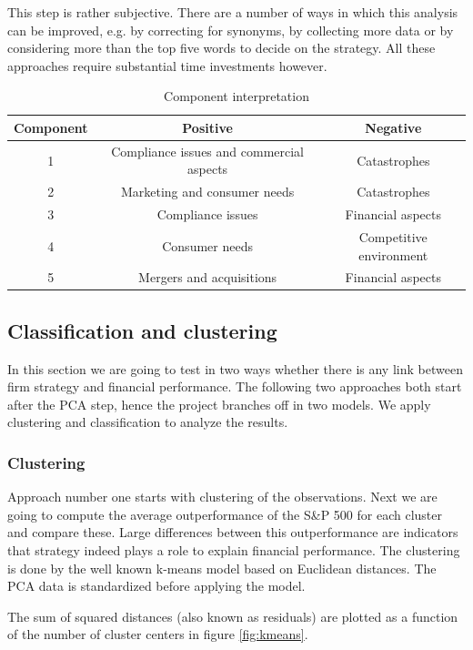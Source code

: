 \documentclass{article}
\begin{document}
This step is rather subjective. There are a number of ways in which this analysis can be improved, e.g. by correcting for synonyms, by collecting more data or by considering more than the top five words to decide on the strategy. All these approaches require substantial time investments however.

\begin{table}[h]
    \centering
    \begin{tabular}{c|c|c}
        \textbf{Component} & \textbf{Positive} & \textbf{Negative} \\
        \hline
         1 & Compliance issues and commercial aspects & Catastrophes \\
         2 & Marketing and consumer needs & Catastrophes \\
         3 & Compliance issues & Financial aspects \\
         4 & Consumer needs & Competitive environment \\
         5 & Mergers and acquisitions & Financial aspects 
    \end{tabular}
    \caption{Component interpretation}
    \label{tab:PCA_meaning}
\end{table}


\subsection{Classification and clustering}
In this section we are going to test in two ways whether there is any link between firm strategy and financial performance. The following two approaches both start after the PCA step, hence the project branches off in two models. We apply clustering and classification to analyze the results.

\subsubsection{Clustering}
Approach number one starts with clustering of the observations. Next we are going to compute the average outperformance of the S\&P 500 for each cluster and compare these. Large differences between this outperformance are indicators that strategy indeed plays a role to explain financial performance. The clustering is done by the well known k-means model based on Euclidean distances. The PCA data is standardized before applying the model.

The sum of squared distances (also known as residuals) are plotted as a function of the number of cluster centers in figure \ref{fig:kmeans}.  
\end{document}
